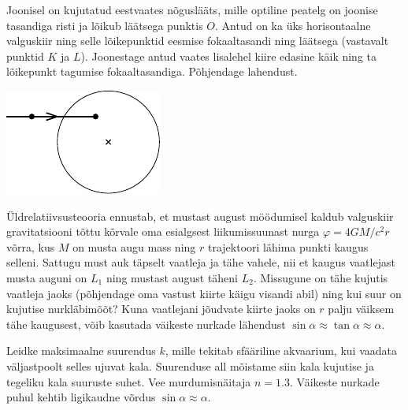 \documentclass[10pt]{article}
\begin{document}
{%

Joonisel on kujutatud eestvaates nõguslääts, mille optiline peatelg on joonise tasandiga risti ja lõikub läätsega punktis $O$. Antud on ka üks horisontaalne valguskiir ning selle lõikepunktid eesmise fokaaltasandi ning läätsega (vastavalt punktid $K$ ja $L$). Joonestage antud vaates lisalehel kiire edasine käik ning ta lõikepunkt tagumise fokaaltasandiga. Põhjendage lahendust.
\begin{center}
	\includegraphics[width=0.5\linewidth]{2011-v2g-10-yl}
\end{center}
\probend
\bigskip


Üldrelatiivsusteooria ennustab, et mustast august möödumisel kaldub valguskiir gravitatsiooni tõttu kõrvale oma esialgsest liikumissuunast nurga $\varphi = 4GM/c^2r$ võrra, kus $M$ on musta augu mass ning $r$ trajektoori lähima punkti kaugus selleni. Sattugu must auk täpselt vaatleja ja tähe vahele, nii et kaugus vaatlejast musta auguni on $L_1$ ning mustast august täheni $L_2$. Missugune on tähe kujutis vaatleja jaoks (põhjendage oma vastust kiirte käigu visandi abil) ning kui suur on kujutise nurkläbimõõt? Kuna vaatlejani jõudvate kiirte jaoks on $r$ palju väiksem tähe kaugusest, võib kasutada väikeste nurkade lähendust $\sin \alpha \approx \tan \alpha \approx \alpha$.
\probend
\bigskip


Leidke maksimaalne suurendus $k$, mille tekitab sfääriline akvaarium, kui vaadata väljastpoolt selles ujuvat kala. Suurenduse all mõistame siin kala kujutise ja tegeliku kala suuruste suhet. Vee murdumisnäitaja $n = \num{1,3}$. Väikeste nurkade puhul kehtib ligikaudne võrdus $\sin \alpha \approx \alpha$.
\probend
\bigskip

}
\end{document}
